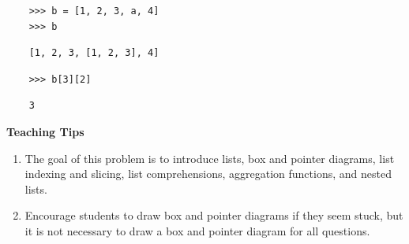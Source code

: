 \begin{blocksection}
    \begin{lstlisting}
    >>> b = [1, 2, 3, a, 4]
    >>> b
    \end{lstlisting}
    \begin{solution}[.25in]
    \begin{lstlisting}
    [1, 2, 3, [1, 2, 3], 4]
    \end{lstlisting}
    \end{solution}

    \begin{lstlisting}
    >>> b[3][2]
    \end{lstlisting}
    \begin{solution}[.25in]
    \begin{lstlisting}
    3
    \end{lstlisting}
    \end{solution}    
\end{blocksection}

    \begin{questionmeta}
        \textbf{Teaching Tips}
        \begin{enumerate}
                \item The goal of this problem is to introduce lists, box and pointer diagrams, list indexing and slicing, list comprehensions, aggregation functions, and nested lists.
                \item Encourage students to draw box and pointer diagrams if they seem stuck, but it is not necessary to draw a box and pointer diagram for all questions. 
        \end{enumerate}
    \end{questionmeta}

